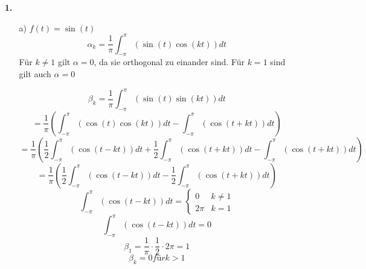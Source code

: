 \documentclass [a4paper,11pt]{article}
\author{\authorinfotitle}
\title{\titleinfo}
\date{\today}
\begin{document}
\maketitle
    \begin{enumerate}
        \item[\textbf{1.}]
            \begin{enumerate}
                \item[a)] $f(t) = \sin(t)$
              	$$\alpha_k = \frac{1}{\pi} \int_{-\pi}^{\pi}(\sin(t)\cos(kt))dt$$
              	Für $k\neq 1$ gilt $\alpha=0$, da sie orthogonal zu einander sind.
              	Für $k = 1$ sind gilt auch $\alpha=0$
              	
              	$$\beta_k = \frac{1}{\pi} \int_{-\pi}^{\pi}(\sin(t)\sin(kt))dt$$
              	$$  = \frac{1}{\pi} \left(  \int_{-\pi}^{\pi}(\cos(t)\cos(kt))dt-\int_{-\pi}^{\pi}(\cos(t+kt))dt\right) $$
              	$$  = \frac{1}{\pi} \left(  \frac{1}{2}\int_{-\pi}^{\pi}(\cos(t-kt))dt +\frac{1}{2}\int_{-\pi}^{\pi}(\cos(t+kt))dt -\int_{-\pi}^{\pi}(\cos(t+kt))dt\right) $$
              	$$  = \frac{1}{\pi} \left(  \frac{1}{2}\int_{-\pi}^{\pi}(\cos(t-kt))dt-\frac{1}{2}\int_{-\pi}^{\pi}(\cos(t+kt))dt\right) $$
              	$$\int_{-\pi}^{\pi}(\cos(t-kt))dt = 
              	\begin{cases}
					0 & k \neq 1\\
					2\pi & k = 1              	
              	\end{cases}$$
              	$$\int_{-\pi}^{\pi}(\cos(t-kt))dt = 0 $$
              	$$\beta_1 = \frac{1}{\pi} \cdot \frac{1}{2} \cdot 2\pi = 1$$
              	$$\beta_k = 0 für k > 1$$
            \end{enumerate}
    \end{enumerate}
\end{document}
